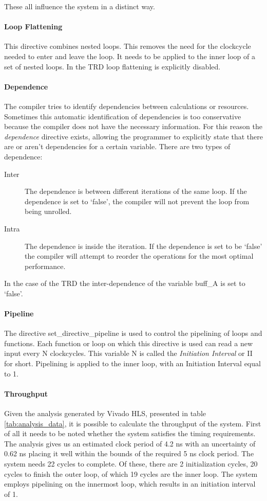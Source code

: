 These all influence the system in a distinct way.

\paragraph{Loop Flattening} This directive combines nested loops. This removes the need for the clockcycle needed to enter and leave the loop. It needs to be applied to the inner loop of a set of nested loops. In the TRD loop flattening is explicitly disabled.

\paragraph{Dependence} The compiler tries to identify dependencies between calculations or resources. Sometimes this automatic identification of dependencies is too conservative because the compiler does not have the necessary information. For this reason the \emph{dependence} directive exists, allowing the programmer to explicitly state that there are or aren't dependencies for a certain variable. There are two types of dependence:

\begin{description}
\item[Inter] The dependence is between different iterations of the same loop. If the dependence is set to `false', the compiler will not prevent the loop from being unrolled.
\item[Intra] The dependence is inside the iteration. If the dependence is set to be `false' the compiler will attempt to reorder the operations for the most optimal performance.
\end{description}

In the case of the TRD the inter-dependence of the variable buff\_A is set to `false'.

\paragraph{Pipeline} The directive set\_directive\_pipeline is used to control the pipelining of loops and functions. Each function or loop on which this directive is used can read a new input every N clockcycles. This variable N is called the \emph{Initiation Interval} or II for short. Pipelining is applied to the inner loop, with an Initiation Interval equal to 1.


\paragraph{Throughput}
\label{sec:original_througput}
Given the analysis generated by Vivado HLS, presented in table \ref{tab:analysis_data}, it is possible to calculate the throughput of the system. First of all it needs to be noted whether the system satisfies the timing requirements. The analysis gives us an estimated clock period of 4.2 ns with an uncertainty of 0.62 ns placing it well within the bounds of the required 5 ns clock period.
The system needs 22 cycles to complete. Of these, there are 2 initialization cycles, 20 cycles to finish the outer loop, of which 19 cycles are the inner loop. The system employs pipelining on the innermost loop, which results in an initiation interval of 1.

